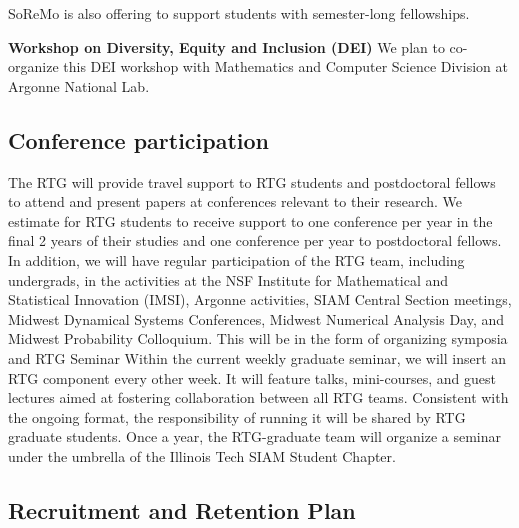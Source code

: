 \documentclass[11pt]{article}
\begin{document}
SoReMo is also offering to support students with semester-long fellowships.   

\textbf{Workshop on Diversity, Equity and Inclusion (DEI)}
We plan to co-organize this DEI workshop with Mathematics and Computer Science Division at   Argonne National Lab. 

\subsection{Conference participation}
The RTG will provide travel support to RTG students and postdoctoral fellows to attend and present
papers at conferences relevant to their research. We estimate for RTG students to receive support to one
conference per year in the final 2 years of their studies and one conference per year to postdoctoral fellows.
In addition, we will have regular participation of the  RTG team, including undergrads, in the  activities at the NSF Institute for Mathematical and Statistical Innovation (IMSI),  Argonne activities, SIAM Central Section meetings, Midwest Dynamical Systems Conferences, Midwest Numerical Analysis Day, and Midwest Probability Colloquium. This will be in the form of organizing symposia and RTG Seminar
Within the current weekly graduate seminar, we will insert an RTG component every other week. It
will feature talks, mini-courses, and guest lectures aimed at fostering collaboration between all RTG teams.
Consistent with the ongoing format, the responsibility of running it will be shared by RTG graduate students.
Once a year, the RTG-graduate team will organize a seminar under the umbrella of the Illinois Tech 
SIAM Student Chapter. 



\subsection{Recruitment and Retention Plan}
\end{document}
